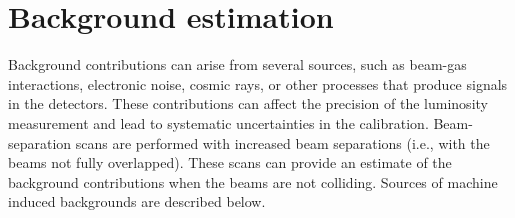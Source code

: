 \section{Background estimation}

Background contributions can arise from several sources, such as beam-gas interactions, electronic noise, cosmic rays, or other processes that produce signals in the detectors. These contributions can affect the precision of the luminosity measurement and lead to systematic uncertainties in the calibration. Beam-separation scans are performed with increased beam separations (i.e., with the beams not fully overlapped). These scans can provide an estimate of the background contributions when the beams are not colliding. Sources of machine induced backgrounds are described below.

